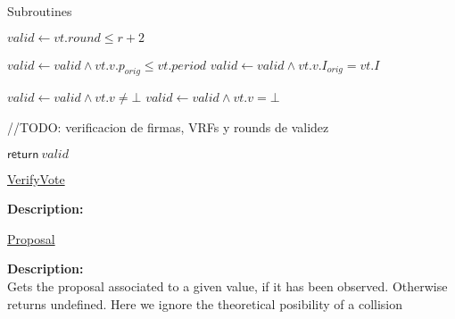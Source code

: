 \documentclass[10pt,a4paper]{article}
\begin{document}
\begin{section}{Subroutines}
\begin{algorithm}[H]
    \begin{algorithmic}[1]
        \State $valid \gets vt.round \leq r+2$
        
            \State $valid \gets valid \land vt.v.p_{orig} \leq vt.period$
                \State $valid \gets valid \land vt.v.I_{orig} = vt.I$
            \EndIf
        \EndIf
        
            \State $valid \gets valid \land vt.v \neq \bot$
            \State $valid \gets valid \land vt.v = \bot$
        \EndIf

        //TODO: verificacion de firmas, VRFs y rounds de validez

        \State $\mathsf{return} \ valid$
    \EndFunction
    \end{algorithmic}
    \caption{\underline{VerifyVote}}
\end{algorithm}

\noindent \textbf{Description:}\\


\begin{algorithm}[H]
    \begin{algorithmic}[1]

        
    \EndIf

    \EndFunction
    \end{algorithmic}
    \caption{\underline{Proposal}}
\end{algorithm}

\noindent \textbf{Description:}\\ Gets the proposal associated to a given value, if it has been observed.
Otherwise returns undefined. Here we ignore the theoretical posibility of a collision


\begin{algorithm}[H]
    \begin{algorithmic}[1]


\end{algorithmic}
\end{algorithm}
\end{section}
\end{document}
